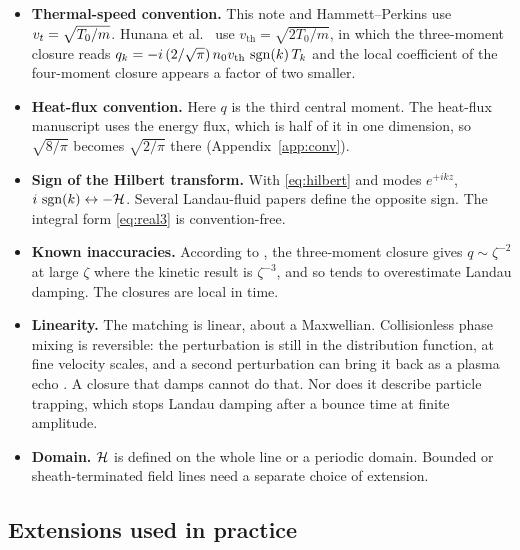 \begin{itemize}
  \item \textbf{Thermal-speed convention.} This note and Hammett--Perkins
    use $v_t=\sqrt{T_0/m}$. Hunana et al.\ \cite{Hunana19} use
    $v_{\mathrm{th}}=\sqrt{2T_0/m}$, in which the three-moment closure
    reads $q_k=-i\,(2/\sqrt\pi)\,n_0v_{\mathrm{th}}\,\operatorname{sgn}(k)\,T_k$ and the
    local coefficient of the four-moment closure appears a factor of two
    smaller.
  \item \textbf{Heat-flux convention.} Here $q$ is the third central
    moment. The heat-flux manuscript uses the energy flux, which is half of
    it in one dimension, so $\sqrt{8/\pi}$ becomes $\sqrt{2/\pi}$ there
    (Appendix~\ref{app:conv}).
  \item \textbf{Sign of the Hilbert transform.} With \eqref{eq:hilbert} and
    modes $e^{+ikz}$, $i\,\operatorname{sgn}(k)\leftrightarrow-\mathcal{H}$. Several
    Landau-fluid papers define the opposite sign. The integral form
    \eqref{eq:real3} is convention-free.
  \item \textbf{Known inaccuracies.} According to \cite{Hunana19}, the
    three-moment closure gives $q\sim\zeta^{-2}$ at large $\zeta$ where the
    kinetic result is $\zeta^{-3}$, and so tends to overestimate Landau
    damping. The closures are local in time.
  \item \textbf{Linearity.} The matching is linear, about a Maxwellian.
    Collisionless phase mixing is reversible: the perturbation is still in
    the distribution function, at fine velocity scales, and a second
    perturbation can bring it back as a plasma echo \cite{Gould67}. A
    closure that damps cannot do that. Nor does it describe particle
    trapping, which stops Landau damping after a bounce time at finite
    amplitude.
  \item \textbf{Domain.} $\mathcal{H}$ is defined on the whole line or a periodic
    domain. Bounded or sheath-terminated field lines need a separate choice
    of extension.
\end{itemize}

\subsection{Extensions used in practice}

